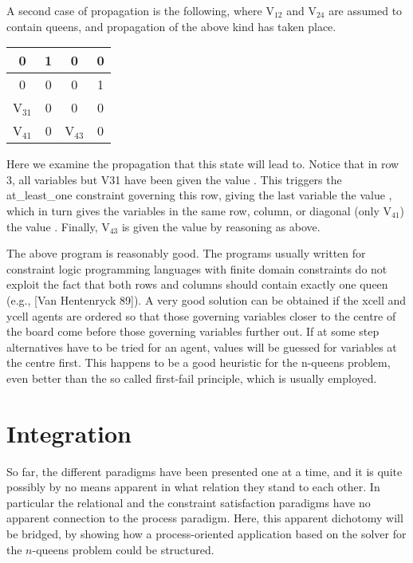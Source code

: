 A second case of propagation is the following, where {\prog V$_{12}$}
and {\prog V$_{24}$} are assumed to contain queens, and propagation of
the above kind has taken place.
%
\begin{center}
\begin{tabular}{|c|c|c|c|}
\hline
0 & 1 & 0 & 0 \\
\hline
0 & 0 & 0 & 1 \\
\hline
V$_{31}$ & 0 & 0 & 0 \\
\hline
V$_{41}$ & 0 & V$_{43}$ & 0 \\
\hline
\end{tabular}
\end{center}
%
Here we examine the propagation that this state will lead to.  Notice
that in row 3, all variables but {\prog V31} have been given the value
{}.  This triggers the {\prog at_least_one} constraint
governing this row, giving the last variable the value {},
which in turn gives the variables in the same row, column, or diagonal
(only V$_{41}$) the value {}.  Finally, {\prog V$_{43}$} is
given the value {} by reasoning as above.

The above program is reasonably good.  The programs usually written
for constraint logic programming languages with finite domain
constraints do not exploit the fact that both rows and columns should
contain exactly one queen (e.g., [Van Hentenryck 89]).  A very good
solution can be obtained if the xcell and ycell agents are ordered so
that those governing variables closer to the centre of the board come
before those governing variables further out.  If at some step
alternatives have to be tried for an agent, values will be guessed for
variables at the centre first.  This happens to be a good heuristic
for the n-queens problem, even better than the so called first-fail
principle, which is usually employed.

\section{Integration}

So far, the different paradigms have been presented one at a time, and
it is quite possibly by no means apparent in what relation they stand
to each other.  In particular the relational and the constraint
satisfaction paradigms have no apparent connection to the process
paradigm.  Here, this apparent dichotomy will be bridged, by showing
how a process-oriented application based on the solver for the
$n$-queens problem could be structured.

